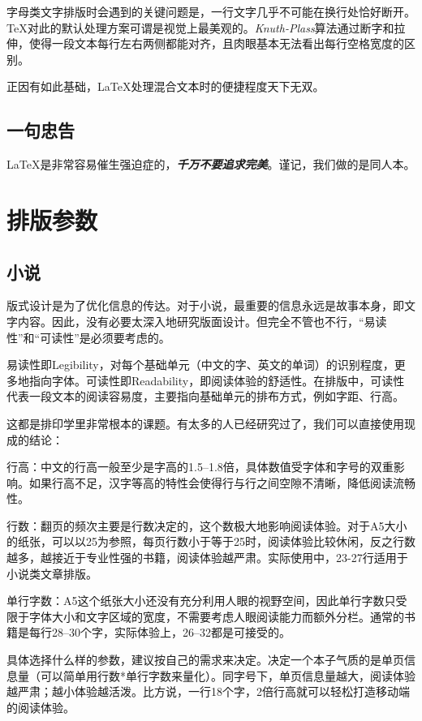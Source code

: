 \documentclass[10pt,openany]{book}
\begin{document}
字母类文字排版时会遇到的关键问题是，一行文字几乎不可能在换行处恰好断开。{\TeX}对此的默认处理方案可谓是视觉上最美观的。\textit{Knuth-Plass}算法通过断字和拉伸，使得一段文本每行左右两侧都能对齐，且肉眼基本无法看出每行空格宽度的区别。

正因有如此基础，{\LaTeX}处理混合文本时的便捷程度天下无双。

\section{一句忠告}

 {\LaTeX}是非常容易催生强迫症的，\emph{\textbf{千万不要追求完美}}。谨记，我们做的是同人本。

\chapter{排版参数}

\section{小说}

版式设计是为了优化信息的传达。对于小说，最重要的信息永远是故事本身，即文字内容。因此，没有必要太深入地研究版面设计。但完全不管也不行，“易读性”和“可读性”是必须要考虑的。

易读性即Legibility，对每个基础单元（中文的字、英文的单词）的识别程度，更多地指向字体。可读性即Readability，即阅读体验的舒适性。在排版中，可读性代表一段文本的阅读容易度，主要指向基础单元的排布方式，例如字距、行高。

这都是排印学里非常根本的课题。有太多的人已经研究过了，我们可以直接使用现成的结论：

行高：中文的行高一般至少是字高的1.5--1.8倍，具体数值受字体和字号的双重影响。如果行高不足，汉字等高的特性会使得行与行之间空隙不清晰，降低阅读流畅性。

行数：翻页的频次主要是行数决定的，这个数极大地影响阅读体验。对于A5大小的纸张，可以以25为参照，每页行数小于等于25时，阅读体验比较休闲，反之行数越多，越接近于专业性强的书籍，阅读体验越严肃。实际使用中，23-27行适用于小说类文章排版。

单行字数：A5这个纸张大小还没有充分利用人眼的视野空间，因此单行字数只受限于字体大小和文字区域的宽度，不需要考虑人眼阅读能力而额外分栏。通常的书籍是每行28--30个字，实际体验上，26--32都是可接受的。

\blankpar

具体选择什么样的参数，建议按自己的需求来决定。决定一个本子气质的是单页信息量（可以简单用行数*单行字数来量化）。同字号下，单页信息量越大，阅读体验越严肃；越小体验越活泼。比方说，一行18个字，2倍行高就可以轻松打造移动端的阅读体验。
\end{document}
